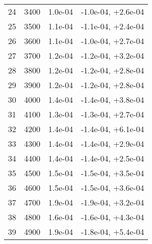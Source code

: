 \begin{table}
\begin{adjustbox}{width=1\textwidth/2}
\begin{tabular}{|c|c|c|c|}
\cline{1-4}
24 & 3400 & 1.0e-04 & -1.0e-04, +2.6e-04 \\
\cline{1-4}
25 & 3500 & 1.1e-04 & -1.1e-04, +2.4e-04 \\
\cline{1-4}
26 & 3600 & 1.1e-04 & -1.0e-04, +2.7e-04 \\
\cline{1-4}
27 & 3700 & 1.2e-04 & -1.2e-04, +3.2e-04 \\
\cline{1-4}
28 & 3800 & 1.2e-04 & -1.2e-04, +2.8e-04 \\
\cline{1-4}
29 & 3900 & 1.2e-04 & -1.2e-04, +2.8e-04 \\
\cline{1-4}
30 & 4000 & 1.4e-04 & -1.4e-04, +3.8e-04 \\
\cline{1-4}
31 & 4100 & 1.3e-04 & -1.3e-04, +2.7e-04 \\
\cline{1-4}
32 & 4200 & 1.4e-04 & -1.4e-04, +6.1e-04 \\
\cline{1-4}
33 & 4300 & 1.4e-04 & -1.4e-04, +2.9e-04 \\
\cline{1-4}
34 & 4400 & 1.4e-04 & -1.4e-04, +2.5e-04 \\
\cline{1-4}
35 & 4500 & 1.5e-04 & -1.5e-04, +3.5e-04 \\
\cline{1-4}
36 & 4600 & 1.5e-04 & -1.5e-04, +3.6e-04 \\
\cline{1-4}
37 & 4700 & 1.9e-04 & -1.9e-04, +3.2e-04 \\
\cline{1-4}
38 & 4800 & 1.6e-04 & -1.6e-04, +4.3e-04 \\
\cline{1-4}
39 & 4900 & 1.9e-04 & -1.8e-04, +5.4e-04 \\
\cline{1-4}
\end{tabular}
\end{adjustbox}
\end{table}

